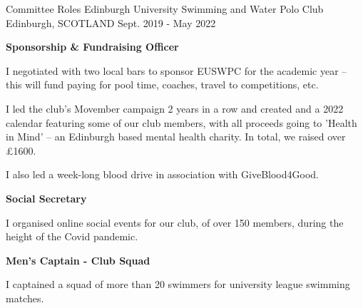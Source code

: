 \begin{cventries}
  \cventry
    {Committee Roles} %
    {Edinburgh University Swimming and Water Polo Club} %
    {Edinburgh, SCOTLAND} %
    {Sept. 2019 - May 2022} %
    {
      \textbf{Sponsorship \& Fundraising Officer}
      \vspace{1.35em}
      \begin{cvitems} %
        \item I negotiated with two local bars to sponsor EUSWPC for the academic year -- this will fund paying for pool time, coaches, travel to competitions, etc.
        \item I led the club's Movember campaign 2 years in a row and created and a 2022 calendar featuring some of our club members, with all proceeds going to 'Health in Mind' -- an Edinburgh based mental health charity. In total, we raised over £1600.
        \item I also led a week-long blood drive in association with GiveBlood4Good.
      \end{cvitems}
      \vspace{1.35em}
      \textbf{Social Secretary}
      \vspace{1.35em}
      \begin{cvitems}
        \item I organised online social events for our club, of over 150 members, during the height of the Covid pandemic.
      \end{cvitems}
      \vspace{1.35em}
      \textbf{Men's Captain - Club Squad}
      \vspace{1.35em}
      \begin{cvitems}
        \item I captained a squad of more than 20 swimmers for university league swimming matches.
      \end{cvitems}
    }
\end{cventries}
